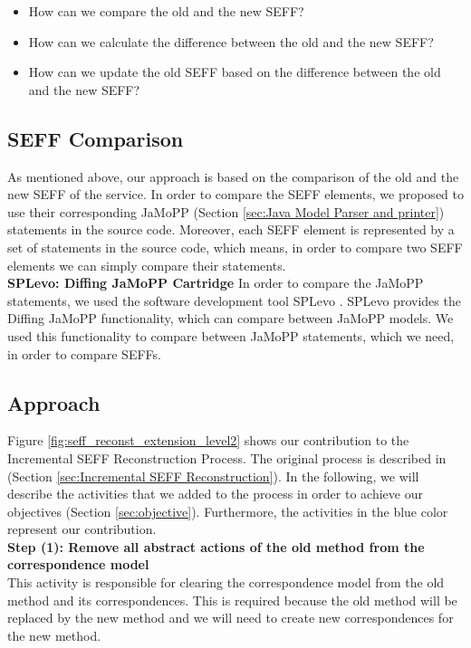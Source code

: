 \begin{itemize}
\item How can we compare the old and the new SEFF?
\item How can we calculate the difference between the old and the new SEFF?
\item How can we update the old SEFF based on the difference between the old and the new SEFF?
\end{itemize}


\subsection{SEFF Comparison}
\label{sec:SEFF Comparison}
As mentioned above, our approach is based on the comparison of the old and the new SEFF of the service. In order to compare the SEFF elements, we proposed to use their corresponding JaMoPP (Section \ref{sec:Java Model Parser and printer}) statements in the source code. Moreover, each SEFF element is represented by a set of statements in the source code, which means, in order to compare two SEFF elements we can simply compare their statements.\\

\textbf{SPLevo: Diffing JaMoPP Cartridge}
In order to compare the JaMoPP statements, we used the software development tool SPLevo \cite{klatt2016consolidation}. SPLevo provides the Diffing JaMoPP functionality, which can compare between JaMoPP models. We used this functionality to compare between JaMoPP statements, which we need, in order to compare SEFFs.

\subsection{Approach}
\label{sec:approach}
Figure \ref{fig:seff_reconst_extension_level2} shows our contribution to the Incremental SEFF Reconstruction Process. The original process is described in (Section \ref{sec:Incremental SEFF Reconstruction}). In the following, we will describe the activities that we added to the process in order to achieve our objectives (Section \ref{sec:objective}). Furthermore, the activities in the blue color represent our contribution.\\

\textbf{Step (1): Remove all abstract actions of the old method from the correspondence model}\\
This activity is responsible for clearing the correspondence model from the old method and its correspondences. This is required because the old method will be replaced by the new method and we will need to create new correspondences for the new method.\\

